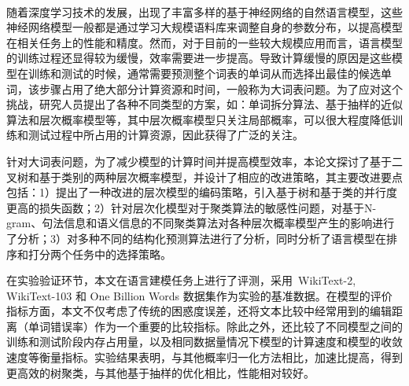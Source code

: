 \documentclass[master,openright,oneside,color]{buaathesis}
\begin{document}


\maketitle
\pagestyle{frontmatter}
\begin{cabstract}
~\

随着深度学习技术的发展，出现了丰富多样的基于神经网络的自然语言模型，这些神经网络模型一般都是通过学习大规模语料库来调整自身的参数分布，以提高模型在相关任务上的性能和精度。然而，对于目前的一些较大规模应用而言，语言模型的训练过程还显得较为缓慢，效率需要进一步提高。导致计算缓慢的原因是这些模型在训练和测试的时候，通常需要预测整个词表的单词从而选择出最佳的候选单词，该步骤占用了绝大部分计算资源和时间，一般称为大词表问题。为了应对这个挑战，研究人员提出了各种不同类型的方案，如：单词拆分算法、基于抽样的近似算法和层次概率模型等，其中层次概率模型只关注局部概率，可以很大程度降低训练和测试过程中所占用的计算资源，因此获得了广泛的关注。

针对大词表问题，为了减少模型的计算时间并提高模型效率，本论文探讨了基于二叉树和基于类别的两种层次概率模型，并设计了相应的改进策略，其主要改进要点包括：1）提出了一种改进的层次模型的编码策略，引入基于树和基于类的并行度更高的损失函数；2）针对层次化模型对于聚类算法的敏感性问题，对基于N-gram、句法信息和语义信息的不同聚类算法对各种层次概率模型产生的影响进行了分析；3）对多种不同的结构化预测算法进行了分析，同时分析了语言模型在排序和打分两个任务中的选择策略。

在实验验证环节，本文在语言建模任务上进行了评测，采用~WikiText-2, WikiText-103 和 One Billion Words 数据集作为实验的基准数据。在模型的评价指标方面，本文不仅考虑了传统的困惑度误差，还将文本比较中经常用到的编辑距离（单词错误率）作为一个重要的比较指标。除此之外，还比较了不同模型之间的训练和测试阶段内存占用量，以及相同数据量情况下模型的计算速度和模型的收敛速度等衡量指标。实验结果表明，与其他概率归一化方法相比，加速比提高，得到更高效的树聚类，与其他基于抽样的优化相比，性能相对较好。

\end{cabstract}
\end{document}
